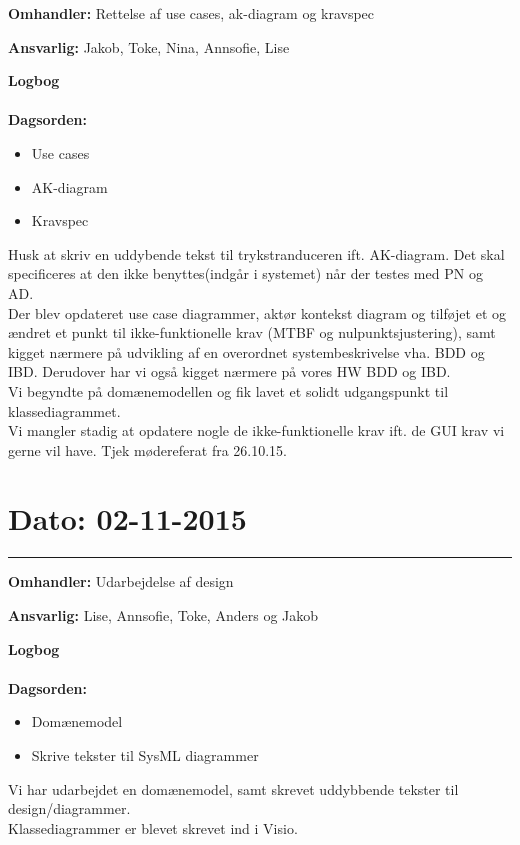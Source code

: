 \textbf{Omhandler:} Rettelse af use cases, ak-diagram og kravspec

\textbf{Ansvarlig:} Jakob, Toke, Nina, Annsofie, Lise 

\textbf{Logbog}
\\
\\
\textbf{Dagsorden:}
\begin{itemize}
	\item Use cases
	\item AK-diagram
	\item Kravspec
\end{itemize}

Husk at skriv en uddybende tekst til trykstranduceren ift. AK-diagram. Det skal specificeres at den ikke benyttes(indgår i systemet) når der testes med PN og AD.
\\
Der blev opdateret use case diagrammer, aktør kontekst diagram og tilføjet et og ændret et punkt til ikke-funktionelle krav (MTBF og nulpunktsjustering), samt kigget nærmere på udvikling af en overordnet systembeskrivelse vha. BDD og IBD. Derudover har vi også kigget nærmere på vores HW BDD og IBD.
\\
Vi begyndte på domænemodellen og fik lavet et solidt udgangspunkt til klassediagrammet. 
\\
Vi mangler stadig at opdatere nogle de ikke-funktionelle krav ift. de GUI krav vi gerne vil have. Tjek mødereferat fra 26.10.15.




\section{Dato: 02-11-2015 }
\hrule

\textbf{Omhandler:} Udarbejdelse af design  

\textbf{Ansvarlig:} Lise, Annsofie, Toke, Anders og Jakob

\textbf{Logbog}
\\
\\
\textbf{Dagsorden:}
\begin{itemize}
	\item Domænemodel
	\item Skrive tekster til SysML diagrammer
\end{itemize}

Vi har udarbejdet en domænemodel, samt skrevet uddybbende tekster til design/diagrammer. \\
Klassediagrammer er blevet skrevet ind i Visio. 




